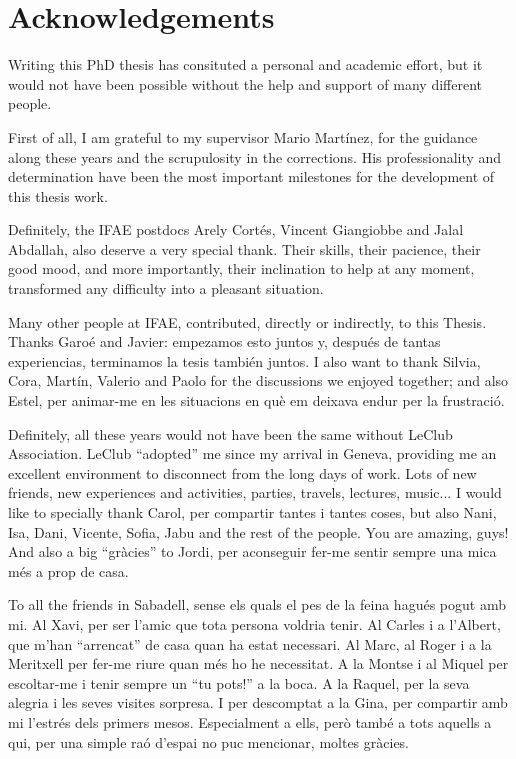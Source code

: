 \chapter*{Acknowledgements}
    \label{Acknowledgements}

Writing this PhD thesis has consituted a personal and academic effort, but it would not have been possible without the help and support of many different people.

First of all, I am grateful to my supervisor Mario Mart\'{i}nez, for the guidance along these years and the scrupulosity in the corrections.
His professionality and determination have been the most important milestones for the development of this thesis work.

Definitely, the IFAE postdocs Arely Cort\'{e}s, Vincent Giangiobbe and Jalal Abdallah, also deserve a very special thank.
Their skills, their pacience, their good mood, and more importantly, their inclination to help at any moment, transformed any difficulty into a pleasant situation. 

Many other people at IFAE, contributed, directly or indirectly, to this Thesis.
Thanks Garo\'{e} and Javier: empezamos esto juntos y, despu\'{e}s de tantas experiencias, terminamos la tesis tambi\'{e}n juntos.
I also want to thank Silvia, Cora, Mart\'{i}n, Valerio and Paolo for the discussions we enjoyed together; and also Estel, per animar-me en les situacions en qu\`{e} em deixava endur per la frustraci\'{o}.

Definitely, all these years would not have been the same without LeClub Association.
LeClub ``adopted'' me since my arrival in Geneva, providing me an excellent environment to disconnect from the long days of work.
Lots of new friends, new experiences and activities, parties, travels, lectures, music...
I would like to specially thank Carol, per compartir tantes i tantes coses, but also Nani, Isa, Dani, Vicente, Sofia, Jabu and the rest of the people.
You are amazing, guys!
And also a big ``gr\`{a}cies'' to Jordi, per aconseguir fer-me sentir sempre una mica m\'{e}s a prop de casa.

To all the friends in Sabadell, sense els quals el pes de la feina hagu\'{e}s pogut amb mi.
Al Xavi, per ser l'amic que tota persona voldria tenir.
Al Carles i a l'Albert, que m'han ``arrencat'' de casa quan ha estat necessari. 
Al Marc, al Roger i a la Meritxell per fer-me riure quan m\'{e}s ho he necessitat. 
A la Montse i al Miquel per escoltar-me i tenir sempre un ``tu pots!'' a la boca.
A la Raquel, per la seva alegria i les seves visites sorpresa.
I per descomptat a la Gina, per compartir amb mi l'estr\'{e}s dels primers mesos.
Especialment a ells, per\`{o} tamb\'{e} a tots aquells a qui, per una simple ra\'{o} d'espai no puc mencionar, moltes gr\`{a}cies.

